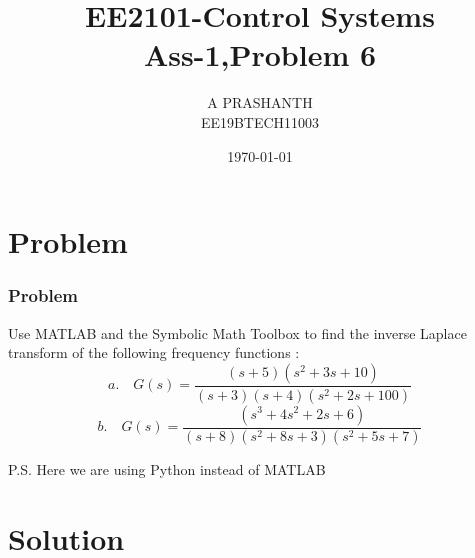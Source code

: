 \documentclass{beamer}
\title{EE2101-Control Systems\\Ass-1,Problem 6}
\author{A PRASHANTH\\EE19BTECH11003}
\date{\today}
\theoremstyle{remark}
\numberwithin{equation}{section}
\begin{document}
\begin{frame}
\titlepage
\end{frame}



\begin{frame}
\tableofcontents
\end{frame}
\section{Problem}

\begin{frame}
\frametitle{Problem }
Use MATLAB and the Symbolic Math Toolbox to find the inverse Laplace transform of the following frequency functions :
\begin{equation}
    a.\quad  G(s) = \frac{(s+5)(s^2+3s+10)}{(s+3)(s+4)(s^2+2s+100)}
\end{equation}
\begin{equation}
    b.\quad G(s) = \frac{(s^3+4s^2+2s+6)}{(s+8)(s^2+8s+3)(s^2+5s+7)}
\end{equation}

\vspace{2.5cm}⁣P.S. Here we are using Python instead of MATLAB


\end{frame}

\section{Solution}
\end{document}
